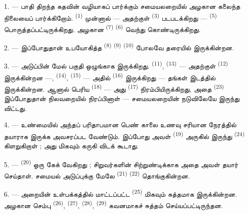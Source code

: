 \VUsaut{4.6mm}
\VUsaut{3.0mm}

1. --- பாதி திறந்த கதவின் வழியாகப் பார்க்கும் சமையலறையில் அழகான
கலைந்த நிலையைப் பார்க்கிறோம்.  \textsuperscript{(1)}
முன்னால் — அதற்குள்  \textsuperscript{(3)}
படபடக்கிறது —  \textsuperscript{(5)}
பொருத்தப்பட்டிருக்கிறது. அழகான  \textsuperscript{(7)}
 \textsuperscript{(6)}
வெந்து கொண்டிருக்கிறது.

2. --- இப்போதுதான் உபயோகித்த 
\textsuperscript{(8)}  \textsuperscript{(9)}
 \textsuperscript{(10)} போலவே தரையில் இருக்கின்றன.

3. --- அடுப்பின் மேல் பகுதி ஒழுங்காக இருக்கிறது. 
\textsuperscript{(11)}, 
\textsuperscript{(13)} — அதற்குள் 
\textsuperscript{(12)} இருக்கின்றன —,  \textsuperscript{(14)}, 
\textsuperscript{(15)} — அதில் 
\textsuperscript{(16)} இருக்கிறது — தங்கள் இடத்தில் இருக்கின்றன. ஆனால்
பெரிய  \textsuperscript{(18)} — அது 
\textsuperscript{(17)} நிரம்பியிருக்கிறது, அதை 
\textsuperscript{(23)} இப்போதுதான் நிலவறையில் நிரப்பினாள் —
சமையலறையின் நடுவிலேயே இருந்து விட்டது.

4. --- உண்மையில் அந்தப் பரிதாபமான பெண் காலை உணவு சரியான நேரத்தில்
தயாராக இருக்க அவசரப்பட வேண்டும். இப்போது அவள்  \textsuperscript{(19)} அருகில் இருந்து 
\textsuperscript{(24)} கிளறுகிறாள் ; அது மிகவும் கருகி விடக் கூடாது.

5. ---  \textsuperscript{(20)} ஒரு கேக்
வேகிறது ; சிறுவர்களின் சிற்றுண்டிக்காக அதை அவள் தயார் செய்தாள்.
சமையல் அடுப்புக்கு மேலே  \textsuperscript{(21)}
 \textsuperscript{(22)} தொங்குகின்றன.

\VUsaut{4.0mm}
\VUsaut{3.0mm}

6. --- அறையின் உள்பக்கத்தில் மாட்டப்பட்ட 
\textsuperscript{(25)} மிகவும் சுத்தமாக இருக்கின்றன. அழகான செம்பு
 \textsuperscript{(26)}, 
\textsuperscript{(27)},  \textsuperscript{(28)},
 \textsuperscript{(29)} கவனமாகச் சுத்தம்
செய்யப்பட்டிருந்தன.

